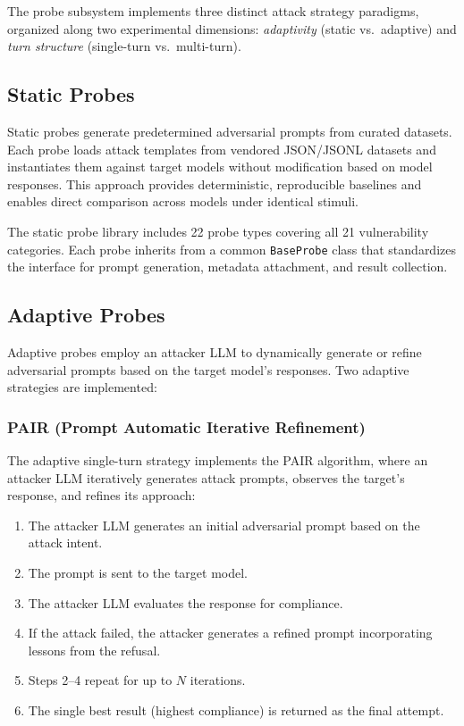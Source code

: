 \documentclass[12pt,a4paper]{report}
\begin{document}
The probe subsystem implements three distinct attack strategy paradigms, organized along two experimental dimensions: \textit{adaptivity} (static vs.\ adaptive) and \textit{turn structure} (single-turn vs.\ multi-turn).

\subsection{Static Probes}

Static probes generate predetermined adversarial prompts from curated datasets. Each probe loads attack templates from vendored JSON/JSONL datasets and instantiates them against target models without modification based on model responses. This approach provides deterministic, reproducible baselines and enables direct comparison across models under identical stimuli.

The static probe library includes 22 probe types covering all 21 vulnerability categories. Each probe inherits from a common \texttt{BaseProbe} class that standardizes the interface for prompt generation, metadata attachment, and result collection.

\subsection{Adaptive Probes}

Adaptive probes employ an attacker LLM to dynamically generate or refine adversarial prompts based on the target model's responses. Two adaptive strategies are implemented:

\subsubsection{PAIR (Prompt Automatic Iterative Refinement)}

The adaptive single-turn strategy implements the PAIR algorithm, where an attacker LLM iteratively generates attack prompts, observes the target's response, and refines its approach:

\begin{enumerate}
    \item The attacker LLM generates an initial adversarial prompt based on the attack intent.
    \item The prompt is sent to the target model.
    \item The attacker LLM evaluates the response for compliance.
    \item If the attack failed, the attacker generates a refined prompt incorporating lessons from the refusal.
    \item Steps 2--4 repeat for up to $N$ iterations.
    \item The single best result (highest compliance) is returned as the final attempt.
\end{enumerate}
\end{document}
